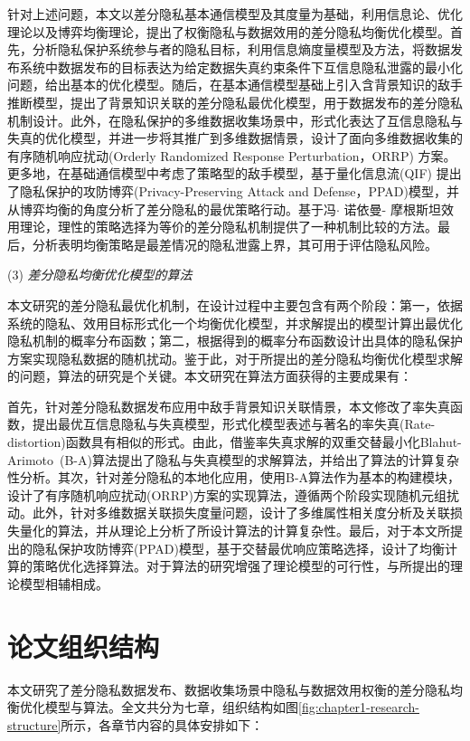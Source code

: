 
针对上述问题，本文以差分隐私基本通信模型及其度量为基础，利用信息论、优化理论以及博弈均衡理论，提出了权衡隐私与数据效用的差分隐私均衡优化模型。首先，分析隐私保护系统参与者的隐私目标，利用信息熵度量模型及方法，将数据发布系统中数据发布的目标表达为给定数据失真约束条件下互信息隐私泄露的最小化问题，给出基本的优化模型。随后，在基本通信模型基础上引入含背景知识的敌手推断模型，提出了背景知识关联的差分隐私最优化模型，用于数据发布的差分隐私机制设计。此外，在隐私保护的多维数据收集场景中，形式化表达了互信息隐私与失真的优化模型，并进一步将其推广到多维数据情景，设计了面向多维数据收集的有序随机响应扰动(Orderly Randomized Response Perturbation，ORRP) 方案。更多地，在基础通信模型中考虑了策略型的敌手模型，基于量化信息流(QIF) 提出了隐私保护的攻防博弈(Privacy-Preserving Attack and Defense，PPAD)模型，并从博弈均衡的角度分析了差分隐私的最优策略行动。基于冯$\cdot$ 诺依曼- 摩根斯坦效用理论，理性的策略选择为等价的差分隐私机制提供了一种机制比较的方法。最后，分析表明均衡策略是最差情况的隐私泄露上界，其可用于评估隐私风险。


(3)  {\em 差分隐私均衡优化模型的算法}

本文研究的差分隐私最优化机制，在设计过程中主要包含有两个阶段：第一，依据系统的隐私、效用目标形式化一个均衡优化模型，并求解提出的模型计算出最优化隐私机制的概率分布函数；第二，根据得到的概率分布函数设计出具体的隐私保护方案实现隐私数据的随机扰动。鉴于此，对于所提出的差分隐私均衡优化模型求解的问题，算法的研究是个关键。本文研究在算法方面获得的主要成果有：


首先，针对差分隐私数据发布应用中敌手背景知识关联情景，本文修改了率失真函数，提出最优互信息隐私与失真模型，形式化模型表述与著名的率失真(Rate-distortion)函数具有相似的形式。由此，借鉴率失真求解的双重交替最小化Blahut-Arimoto~(B-A)算法\cite{blahut1972computation,arimoto1972an}提出了隐私与失真模型的求解算法，并给出了算法的计算复杂性分析。其次，针对差分隐私的本地化应用，使用B-A算法作为基本的构建模块，设计了有序随机响应扰动(ORRP)方案的实现算法，遵循两个阶段实现随机元组扰动。此外，针对多维数据关联损失度量问题，设计了多维属性相关度分析及关联损失量化的算法，并从理论上分析了所设计算法的计算复杂性。最后，对于本文所提出的隐私保护攻防博弈(PPAD)模型，基于交替最优响应策略选择，设计了均衡计算的策略优化选择算法。对于算法的研究增强了理论模型的可行性，与所提出的理论模型相辅相成。



\section{论文组织结构}
本文研究了差分隐私数据发布、数据收集场景中隐私与数据效用权衡的差分隐私均衡优化模型与算法。全文共分为七章，组织结构如图\ref{fig:chapter1-research-structure}所示，各章节内容的具体安排如下：

